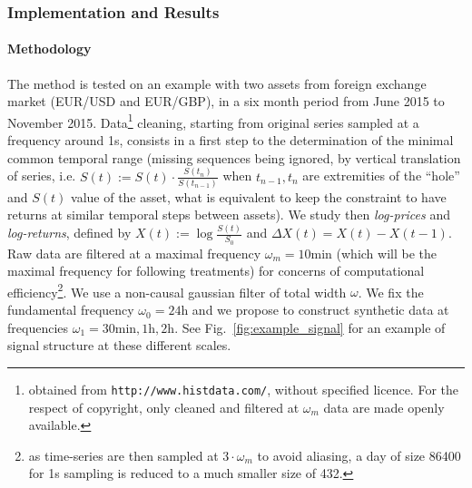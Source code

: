 \subsubsection{Implementation and Results}

\paragraph{Methodology}

The method is tested on an example with two assets from foreign exchange market (EUR/USD and EUR/GBP), in a six month period from June 2015 to November 2015. Data\footnote{obtained from \texttt{http://www.histdata.com/}, without specified licence. For the respect of copyright, only cleaned and filtered at $\omega_m$ data are made openly available.} cleaning, starting from original series sampled at a frequency around 1s, consists in a first step to the determination of the minimal common temporal range (missing sequences being ignored, by vertical translation of series, i.e. $S(t):=S(t)\cdot \frac{S(t_{n})}{S(t_{n-1})}$ when $t_{n-1},t_n$ are extremities of the ``hole'' and $S(t)$ value of the asset, what is equivalent to keep the constraint to have returns at similar temporal steps between assets). We study then \emph{log-prices} and \emph{log-returns}, defined by $X(t):=\log{\frac{S(t)}{S_0}}$ and $\Delta X (t) = X(t) - X(t-1)$. Raw data are filtered at a maximal frequency $\omega_m = 10\textrm{min}$ (which will be the maximal frequency for following treatments) for concerns of computational efficiency\footnote{as time-series are then sampled at $3\cdot\omega_m$ to avoid aliasing, a day of size 86400 for 1s sampling is reduced to a much smaller size of 432.}. We use a non-causal gaussian filter of total width $\omega$. We fix the fundamental frequency $\omega_0=24\textrm{h}$ and we propose to construct synthetic data at frequencies $\omega_1 = 30\textrm{min},1\textrm{h},2\textrm{h}$. See Fig.~\ref{fig:example_signal} for an example of signal structure at these different scales.

